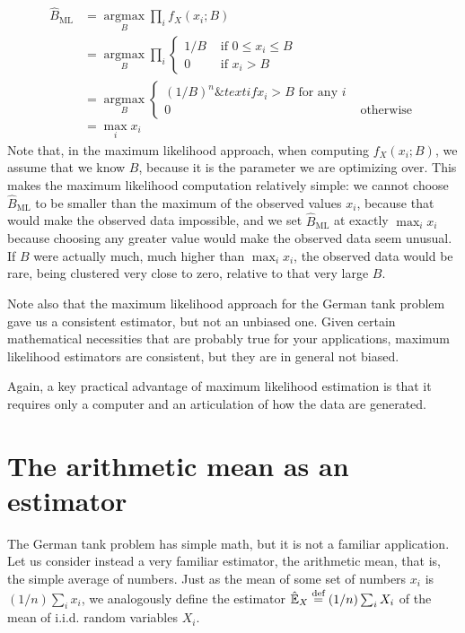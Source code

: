 \begin{align*}
    \hat{B}_\mathrm{ML}
    &= \underset{B}{\operatorname{argmax}} \prod_i f_X(x_i; B) \\
    &= \underset{B}{\operatorname{argmax}} \prod_i \begin{cases}
      1/B &\text{ if } 0 \leq x_i \leq B \\
      0 &\text{ if } x_i > B
    \end{cases} \\
    &= \underset{B}{\operatorname{argmax}} \begin{cases}
      (1/B)^n \&text{ if } x_i > B \text{ for any $i$} \\
      0 &\text{ otherwise}
     \end{cases} \\
    &= \max_i x_i
\end{align*}
Note that, in the maximum likelihood approach, when computing $f_X(x_i; B)$, we assume that we know $B$, because it is the parameter we are optimizing over. This makes the maximum likelihood computation relatively simple: we cannot choose $\hat{B}_\mathrm{ML}$ to be smaller than the maximum of the observed values $x_i$, because that would make the observed data impossible, and we set $\hat{B}_\mathrm{ML}$ at exactly $\max_i x_i$ because choosing any greater value would make the observed data seem unusual. If $B$ were actually much, much higher than $\max_i x_i$, the observed data would be rare, being clustered very close to zero, relative to that very large $B$.

Note also that the maximum likelihood approach for the German tank problem gave us a consistent estimator, but not an unbiased one. Given certain mathematical necessities that are probably true for your applications, maximum likelihood estimators are consistent, but they are in general not biased.

Again, a key practical advantage of maximum likelihood estimation is that it requires only a computer and an articulation of how the data are generated.


\section{The arithmetic mean as an estimator}

The German tank problem has simple math, but it is not a familiar application. Let us consider instead a very familiar estimator, the arithmetic mean, that is, the simple average of numbers. Just as the mean of some set of numbers $x_i$ is $(1/n) \sum_i x_i$, we analogously define the estimator $\hat{\mathbb{E}}_X \stackrel{\text{def}}{=} (1/n) \sum_i X_i$ of the mean of i.i.d. random variables $X_i$.

